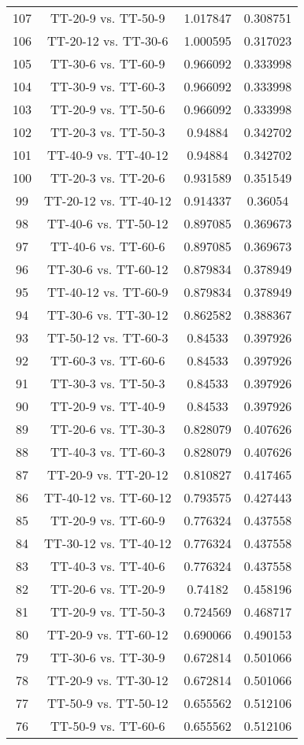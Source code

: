 \documentclass[a4paper,10pt]{article}
\begin{document}
\begin{landscape}
\begin{table}[!htp]
\begin{tabular}{cccc}
107&TT-20-9 vs. TT-50-9&1.017847&0.308751\\
106&TT-20-12 vs. TT-30-6&1.000595&0.317023\\
105&TT-30-6 vs. TT-60-9&0.966092&0.333998\\
104&TT-30-9 vs. TT-60-3&0.966092&0.333998\\
103&TT-20-9 vs. TT-50-6&0.966092&0.333998\\
102&TT-20-3 vs. TT-50-3&0.94884&0.342702\\
101&TT-40-9 vs. TT-40-12&0.94884&0.342702\\
100&TT-20-3 vs. TT-20-6&0.931589&0.351549\\
99&TT-20-12 vs. TT-40-12&0.914337&0.36054\\
98&TT-40-6 vs. TT-50-12&0.897085&0.369673\\
97&TT-40-6 vs. TT-60-6&0.897085&0.369673\\
96&TT-30-6 vs. TT-60-12&0.879834&0.378949\\
95&TT-40-12 vs. TT-60-9&0.879834&0.378949\\
94&TT-30-6 vs. TT-30-12&0.862582&0.388367\\
93&TT-50-12 vs. TT-60-3&0.84533&0.397926\\
92&TT-60-3 vs. TT-60-6&0.84533&0.397926\\
91&TT-30-3 vs. TT-50-3&0.84533&0.397926\\
90&TT-20-9 vs. TT-40-9&0.84533&0.397926\\
89&TT-20-6 vs. TT-30-3&0.828079&0.407626\\
88&TT-40-3 vs. TT-60-3&0.828079&0.407626\\
87&TT-20-9 vs. TT-20-12&0.810827&0.417465\\
86&TT-40-12 vs. TT-60-12&0.793575&0.427443\\
85&TT-20-9 vs. TT-60-9&0.776324&0.437558\\
84&TT-30-12 vs. TT-40-12&0.776324&0.437558\\
83&TT-40-3 vs. TT-40-6&0.776324&0.437558\\
82&TT-20-6 vs. TT-20-9&0.74182&0.458196\\
81&TT-20-9 vs. TT-50-3&0.724569&0.468717\\
80&TT-20-9 vs. TT-60-12&0.690066&0.490153\\
79&TT-30-6 vs. TT-30-9&0.672814&0.501066\\
78&TT-20-9 vs. TT-30-12&0.672814&0.501066\\
77&TT-50-9 vs. TT-50-12&0.655562&0.512106\\
76&TT-50-9 vs. TT-60-6&0.655562&0.512106\\

\end{tabular}
\end{table}
\end{landscape}
\end{document}
